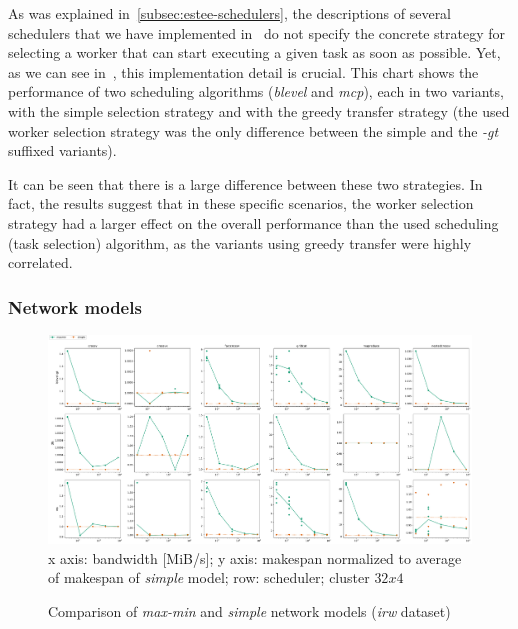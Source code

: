 As was explained in~\ref{subsec:estee-schedulers}, the descriptions of several schedulers that we have
implemented in~\estee{} do not specify the concrete strategy for selecting a worker
that can start executing a given task as soon as possible. Yet, as we can see
in~, this implementation detail is crucial. This chart shows the performance
of two scheduling algorithms (\emph{blevel} and \emph{mcp}), each in two
variants, with the simple selection strategy and with the greedy transfer strategy (the used worker
selection strategy was the only difference between the simple and the \emph{-gt}
suffixed variants).

It can be seen that there is a large difference between these two strategies. In fact, the results
suggest that in these specific scenarios, the worker selection strategy had a larger effect on the
overall performance than the used scheduling (task selection) algorithm, as the variants using
greedy transfer were highly correlated.

\subsubsection*{Network models}

\begin{figure}
	\centering
	\includegraphics[width=\textwidth]{imgs/estee/charts/irw-32x4-netmodel-score}\\
	{\small x axis: bandwidth [MiB/s]; y axis: makespan normalized to average
	of makespan of \emph{simple} model; row: scheduler; cluster $32x4$}
	\caption{Comparison of \emph{max-min} and \emph{simple} network models
	(\emph{irw} dataset)} \label{fig:estee-chart-irw-netmodel}
\end{figure}

